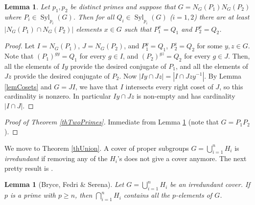 \documentclass[11pt]{amsart}
\numberwithin{equation}{section}
\newtheorem{lemma}[theorem]{Lemma}
\theoremstyle{definition}
\theoremstyle{remark}
\newcommand{\Syl}{\mathop{\mathrm{Syl}}}
\begin{document}
\begin{lemma} \label{lemSyn}
Let $p_1,p_2$ be distinct primes and suppose that $G=N_G(P_1) N_G(P_2)$ where $P_i \in \Syl_{p_i}(G)$.
Then for all $Q_i \in \Syl_{p_i}(G)$ ($i=1,2$)
there are at least $|N_G(P_1) \cap N_G(P_2)|$ elements $x \in G$ such that $P_1^x = Q_1$ and $P_2^x= Q_2$.
\end{lemma}
\begin{proof}
Let $I=N_G(P_1)$, $J=N_G(P_2)$,
and $P_1^y=Q_1$, $P_2^z = Q_2$ for some $y,z \in G$.
Note that $(P_1)^{gy}=Q_1$ for every $g \in I$, and $(P_2)^{gz}=Q_2$ for every $g \in J$.
Then, all the elements of $Iy$ provide the desired conjugate of $P_1$,
and all the elements of $Jz$ provide the desired conjugate of $P_2$.
Now $|Iy \cap Jz| = |I \cap Jzy^{-1}|$.
By Lemma \ref{lemCosets} and $G=JI$,
we have that $I$ intersects every right coset of $J$, so this cardinality is nonzero.
In particular $Iy \cap Jz$ is non-empty and has cardinality $|I \cap J|$.
\end{proof}

\begin{proof}[Proof of Theorem \ref{thTwoPrimes}]
Immediate from Lemma \ref{lemSyn} (note that $G=P_1P_2$).
\end{proof}

We move to Theorem \ref{thUnion}.
A cover of proper subgroups $G = \bigcup_{i=1}^n H_i$ is {\itshape irredundant}
if removing any of the $H_i$'s does not give a cover anymore.
The next pretty result is \cite[Lem. 2.2]{BFS95}.

\begin{lemma}[Bryce, Fedri \& Serena] \label{lemBFS}
Let $G = \bigcup_{i=1}^n H_i$ be an irredundant cover.
If $p$ is a prime with $p \geq n$, then $\bigcap_{i=1}^n H_i$ contains all the $p$-elements of $G$.
\end{lemma}
\end{document}
